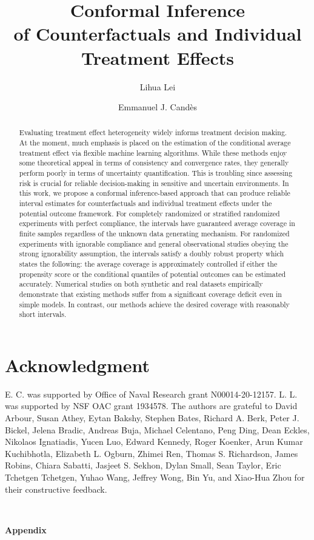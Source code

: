 \documentclass{statsoc}
\title[Conformal Inference of Counterfactuals and Individual Treatment Effects]{Conformal Inference\\ of Counterfactuals and Individual Treatment Effects}
\author{Lihua Lei}
\author[Lihua Lei and Emmanuel J. Cand\`{e}s]{Emmanuel J. Cand\`{e}s}
\numberwithin{equation}{section}
\newcommand{\allison}[1]{\textcolor{magenta}{[AS: #1]}}
\begin{document}
\maketitle

\begin{abstract}
  Evaluating treatment effect heterogeneity widely informs treatment
  decision making. At the moment, much emphasis is placed on the
  estimation of the conditional average treatment effect via flexible
  machine learning algorithms. While these methods enjoy some
  theoretical appeal in terms of consistency and convergence rates,
  they generally perform poorly in terms of uncertainty
  quantification. This is troubling since assessing risk is crucial
  for reliable decision-making in sensitive and uncertain
  environments. In this work, we propose a conformal inference-based
  approach that can produce reliable interval estimates for
  counterfactuals and individual treatment effects under the potential
  outcome framework. For completely randomized or stratified randomized experiments with perfect
  compliance, the intervals have guaranteed average coverage in finite
  samples regardless of the unknown data generating mechanism. For
  randomized experiments with ignorable compliance and general
  observational studies obeying the strong ignorability assumption,
  the intervals satisfy a doubly robust property which states the
  following: the average coverage is approximately controlled if
  either the propensity score or the conditional quantiles of
  potential outcomes can be estimated accurately.  Numerical studies
  on both synthetic and real datasets empirically demonstrate that
  existing methods suffer from a significant coverage deficit even in
  simple models. In contrast, our methods achieve the
  desired coverage with reasonably short intervals. %
\end{abstract}








\section*{Acknowledgment}
E. C. was supported by Office of Naval Research grant N00014-20-12157. L. L. was supported by NSF OAC grant 1934578. %
The authors are grateful to David Arbour, Susan Athey, Eytan Bakshy, Stephen Bates, Richard A. Berk, Peter J. Bickel, Jelena Bradic, Andreas Buja, Michael Celentano, Peng Ding, Dean Eckles, Nikolaos Ignatiadis, Yucen Luo, Edward Kennedy, Roger Koenker, Arun Kumar Kuchibhotla, Elizabeth L. Ogburn, Zhimei Ren, Thomas S. Richardson, James Robins, Chiara Sabatti, Jasjeet S. Sekhon, Dylan Small, Sean Taylor, Eric Tchetgen Tchetgen, Yuhao Wang, Jeffrey Wong, Bin Yu, and Xiao-Hua Zhou for their constructive feedback.




\clearpage
\appendix

~\\
\begin{center}
  \begin{Large}
    \textbf{Appendix}
  \end{Large}
\end{center}


\end{document}
